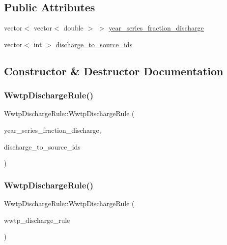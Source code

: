 \subsection*{Public Attributes}
\begin{DoxyCompactItemize}
\item 
vector$<$ vector$<$ double $>$ $>$ \mbox{\hyperlink{classWwtpDischargeRule_a5d193e0cbc2eb23e1b86e79fb2eafad3}{year\+\_\+series\+\_\+fraction\+\_\+discharge}}
\item 
vector$<$ int $>$ \mbox{\hyperlink{classWwtpDischargeRule_ac2f77a9fca93eef3fd26ff1d579130be}{discharge\+\_\+to\+\_\+source\+\_\+ids}}
\end{DoxyCompactItemize}


\subsection{Constructor \& Destructor Documentation}
\mbox{\label{classWwtpDischargeRule_ae904657855c9d983ea0e5995109cd561}} 
\subsubsection{\texorpdfstring{Wwtp\+Discharge\+Rule()}{WwtpDischargeRule()}\hspace{0.1cm}{\footnotesize\ttfamily [1/2]}}
{\footnotesize\ttfamily Wwtp\+Discharge\+Rule\+::\+Wwtp\+Discharge\+Rule (\begin{DoxyParamCaption}\item[{vector$<$ vector$<$ double $>$$>$}]{year\+\_\+series\+\_\+fraction\+\_\+discharge,  }\item[{vector$<$ int $>$}]{discharge\+\_\+to\+\_\+source\+\_\+ids }\end{DoxyParamCaption})}

\mbox{\label{classWwtpDischargeRule_ac433e50df1414ba4bbb40022832b43ff}} 
\subsubsection{\texorpdfstring{Wwtp\+Discharge\+Rule()}{WwtpDischargeRule()}\hspace{0.1cm}{\footnotesize\ttfamily [2/2]}}
{\footnotesize\ttfamily Wwtp\+Discharge\+Rule\+::\+Wwtp\+Discharge\+Rule (\begin{DoxyParamCaption}\item[{\mbox{\hyperlink{classWwtpDischargeRule}{Wwtp\+Discharge\+Rule}} \&}]{wwtp\+\_\+discharge\+\_\+rule }\end{DoxyParamCaption})}



